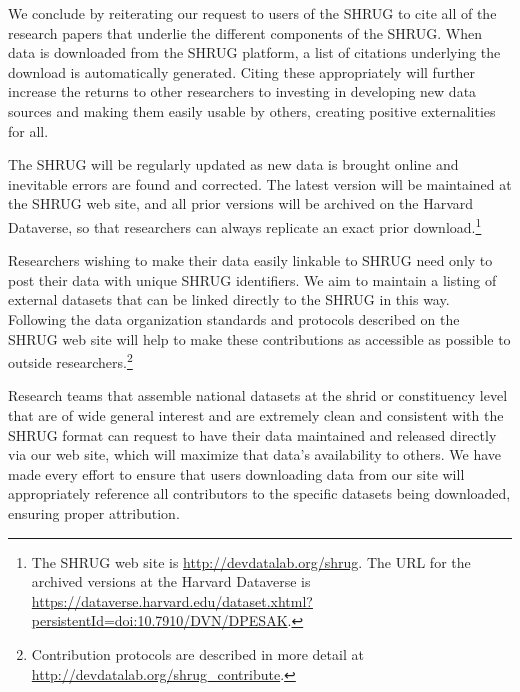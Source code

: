 \documentclass[12pt,letterpaper]{article}
\begin{document}
We conclude by reiterating our request to users of the SHRUG to cite
all of the research papers that underlie the different components of
the SHRUG. When data is downloaded from the SHRUG platform, a list of
citations underlying the download is automatically generated. Citing
these appropriately will further increase the returns to other
researchers to investing in developing new data sources and making
them easily usable by others, creating positive externalities for all.

The SHRUG will be regularly updated as new data is brought online and
inevitable errors are found and corrected. The latest version will be
maintained at the SHRUG web site, and all prior versions will be
archived on the Harvard Dataverse, so that researchers can always
replicate an exact prior download.\footnote{The SHRUG web site is
  \href{http://devdatalab.org/shrug}{http://devdatalab.org/shrug}. The
  URL for the archived versions at the Harvard Dataverse is
  \href{https://dataverse.harvard.edu/dataset.xhtml?persistentId=doi:10.7910/DVN/DPESAK}{https://dataverse.harvard.edu/dataset.xhtml?persistentId=doi:10.7910/DVN/DPESAK}.}

Researchers wishing to make their data easily linkable to SHRUG need
only to post their data with unique SHRUG identifiers. We aim to
maintain a listing of external datasets that can be linked directly to
the SHRUG in this way. Following the data organization standards and
protocols described on the SHRUG web site will help to make these
contributions as accessible as possible to outside
researchers.\footnote{Contribution protocols are described in more
  detail at
  \href{http://devdatalab.org/shrug\_contribute}{http://devdatalab.org/shrug\_contribute}.}

Research teams that assemble national datasets at the shrid or
constituency level that are of wide general interest and are extremely
clean and consistent with the SHRUG format can request to have their
data maintained and released directly via our web site, which will
maximize that data's availability to others.  We have made every
effort to ensure that users downloading data from our site will
appropriately reference all contributors to the specific datasets
being downloaded, ensuring proper attribution.
\end{document}
